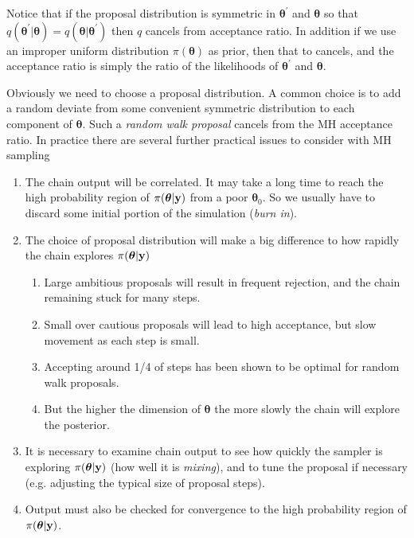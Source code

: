 \documentclass[10pt] {article}
\theoremstyle{definition}
\begin{document}
Notice that if the proposal distribution is symmetric in ${\bm \theta}^\prime $ and ${\bm \theta} $ so that $q({\bm \theta}^\prime|{\bm \theta}) = q({\bm \theta}|{\bm \theta}^\prime) $ then $q$ cancels from acceptance ratio. In addition if we use an improper uniform distribution $\pi({\bm \theta})$ as prior, then that to cancels, and the acceptance ratio is simply the ratio of the likelihoods of ${\bm \theta}^\prime $ and ${\bm \theta}$. 

Obviously we need to choose a proposal distribution. A common choice is to add a random deviate from some convenient symmetric distribution to each component of $\bm \theta$. Such a {\em random walk proposal} cancels from the MH acceptance ratio.  In practice there are several further practical issues to consider with MH sampling
\begin{enumerate}
\item The chain output will be correlated. It may take a long time to reach the high probability region of $\pi({\bm \theta}|{\bf y})$ from a poor ${\bm \theta}_0$.
So we usually have to discard some initial portion of the simulation ({\em burn in}).
\item The choice of proposal distribution will make a big difference to how rapidly the chain explores  $\pi({\bm \theta}|{\bf y})$
\begin{enumerate}
\item Large ambitious proposals will result in frequent rejection, and the chain remaining stuck for many steps.
\item Small over cautious proposals will lead to high acceptance, but slow movement as each step is small.
\item Accepting around 1/4 of steps has been shown to be optimal for random walk proposals. 
\item But the higher the dimension of $\bm \theta$ the more slowly the chain will explore the posterior.   
\end{enumerate} 
\item It is necessary to examine chain output to see how quickly the sampler is exploring $\pi({\bm \theta}|{\bf y})$ (how well it is {\em mixing}), and to tune the proposal if necessary (e.g. adjusting the typical size of proposal steps).
\item Output must also be checked for convergence to the high probability region of $\pi({\bm \theta}|{\bf y})$.
\end{enumerate}
\end{document}
